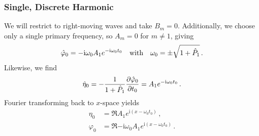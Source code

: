 \documentclass{jfm}
\let\Oldsubsubsection\subsubsection
\renewcommand{\subsubsection}{\FloatBarrier\Oldsubsubsection}
\newcommand{\POne}{\hat{P}_1}
\newcommand{\im}{\mathrm{i}}
\begin{document}
\subsubsection{Single, Discrete Harmonic}
We will restrict to right-moving waves and take $B_m = 0$.
Additionally, we choose only a single primary frequency, so $A_m = 0$
for $m\neq 1$, giving
\begin{equation}
  \hat{\varphi}_0 = -\im \omega_0  A_1 e^{-\im \omega_0 t_0}
    \qq{with} \omega_0 = \pm \sqrt{1+\POne} \,.
\end{equation}
Likewise, we find
\begin{equation}
  \hat{\eta}_0 = - \frac{1}{1+\POne} \pdv{\hat{\varphi}_0}{t_0} = A_1
    e^{-\im \omega_0 t_0} \,.
\end{equation}
Fourier transforming back to $x$-space yields
\begin{align}
  \eta_0 &= \Re{A_1 e^{\im(x-\omega_0 t_0)}} \,, \\
  \varphi_0 &= \Re{- \im \omega_0 A_1 e^{\im(x-\omega_0 t_0)}} \,.
\end{align}
\end{document}
